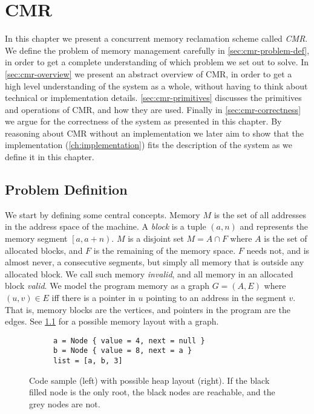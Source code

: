 \chapter{CMR\label{ch:cmr}}

In this chapter we present a concurrent memory reclamation scheme called \emph{CMR}.  We define the
problem of memory management carefully in \cref{sec:cmr-problem-def}, in order to get a complete
understanding of which problem we set out to solve.  In \cref{sec:cmr-overview} we present an
abstract overview of CMR, in order to get a high level understanding of the system as a whole,
without having to think about technical or implementation details.  \cref{sec:cmr-primitives}
discusses the primitives and operations of CMR, and how they are used.  Finally in
\cref{sec:cmr-correctness} we argue for the correctness of the system as presented in this chapter.
By reasoning about CMR without an implementation we later aim to show that the implementation
(\cref{ch:implementation}) fits the description of the system as we define it in this chapter.



\section{Problem Definition\label{sec:cmr-problem-def}}

We start by defining some central concepts. Memory $M$ is the set of all addresses in the address
space of the machine. A \emph{block} is a tuple $(a, n)$ and represents the memory segment
$\left[a, a + n\right)$. $M$ is a disjoint set $M = A \cap F$ where $A$ is the set of allocated
blocks, and $F$ is the remaining of the memory space. $F$ needs not, and is almost never, a
consecutive segments, but simply all memory that is outside any allocated block. We call such
memory \emph{invalid}, and all memory in an allocated block \emph{valid}.  We model the program
memory as a graph $G = (A, E)$ where $(u, v) \in E$ iff there is a pointer in $u$ pointing to an
address in the segment $v$. That is, memory blocks are the vertices, and pointers in the program
are the edges. See \cref{fig:memory-graph} for a possible memory layout with a graph.

\begin{figure}[ht]
  \centering
  \begin{subfigure}{0.45\textwidth}
    \begin{lstlisting}[style=Rust]
a = Node { value = 4, next = null }
b = Node { value = 8, next = a }
list = [a, b, 3]
    \end{lstlisting}
  \end{subfigure}
  \hfill
  \begin{subfigure}{0.45\textwidth}
    
  \end{subfigure}
  \caption{Code sample (left) with possible heap layout (right). If the black filled node is the
  only root, the black nodes are reachable, and the grey nodes are not.\label{fig:memory-graph}}
\end{figure}

